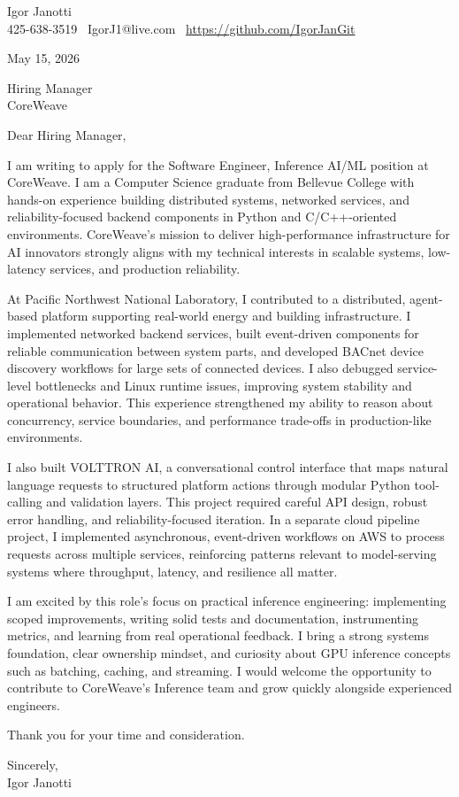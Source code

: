 \documentclass[11pt]{article}
\begin{document}
Igor Janotti\\
425-638-3519 \textbar\ IgorJ1@live.com \textbar\ \url{https://github.com/IgorJanGit}

May 15, 2026

Hiring Manager\\
CoreWeave

Dear Hiring Manager,

I am writing to apply for the Software Engineer, Inference AI/ML position at CoreWeave. I am a Computer Science graduate from Bellevue College with hands-on experience building distributed systems, networked services, and reliability-focused backend components in Python and C/C++-oriented environments. CoreWeave's mission to deliver high-performance infrastructure for AI innovators strongly aligns with my technical interests in scalable systems, low-latency services, and production reliability.

At Pacific Northwest National Laboratory, I contributed to a distributed, agent-based platform supporting real-world energy and building infrastructure. I implemented networked backend services, built event-driven components for reliable communication between system parts, and developed BACnet device discovery workflows for large sets of connected devices. I also debugged service-level bottlenecks and Linux runtime issues, improving system stability and operational behavior. This experience strengthened my ability to reason about concurrency, service boundaries, and performance trade-offs in production-like environments.

I also built VOLTTRON AI, a conversational control interface that maps natural language requests to structured platform actions through modular Python tool-calling and validation layers. This project required careful API design, robust error handling, and reliability-focused iteration. In a separate cloud pipeline project, I implemented asynchronous, event-driven workflows on AWS to process requests across multiple services, reinforcing patterns relevant to model-serving systems where throughput, latency, and resilience all matter.

I am excited by this role's focus on practical inference engineering: implementing scoped improvements, writing solid tests and documentation, instrumenting metrics, and learning from real operational feedback. I bring a strong systems foundation, clear ownership mindset, and curiosity about GPU inference concepts such as batching, caching, and streaming. I would welcome the opportunity to contribute to CoreWeave's Inference team and grow quickly alongside experienced engineers.

Thank you for your time and consideration.

Sincerely,\\
Igor Janotti
\end{document}
